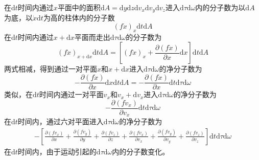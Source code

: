\documentclass[12pt,a4paper]{article}
\newcommand{\dif}{\mathrm{d}}
\begin{document}
在$\dif t$时间内通过$x$平面中的面积$\dif A = \dif y \dif z \dif v_x \dif v_y \dif v_z$进入$\dif \tau \dif \omega$内的分子数为以$\dif A$为底，以$\dot{x} \dif t$为高的柱体内的分子数
\begin{equation*}
(f \dot{x})_x \dif t \dif A
\end{equation*}
在$\dif t$时间内通过$x +\dif x$平面而走出$\dif \tau \dif \omega$的分子数为
\begin{equation*}
(f \dot{x})_{x+\dif x} \dif t \dif A = \left[(f \dot{x})_x +\frac{\partial (f \dot{x})}{\partial x} \dif x\right] \dif t \dif A
\end{equation*}
两式相减，得到通过一对平面$x$和$x +\dif x$进入$\dif \tau \dif \omega$的净分子数为
\begin{equation*}
-\frac{\partial (f \dot{x})}{\partial x} \dif x \dif t \dif A = -\frac{\partial (f \dot{x})}{\partial x} \dif t \dif \tau \dif \omega
\end{equation*}
类似，在$\dif t$时间内通过一对平面$v_x$和$v_x +\dif v_x$进入$\dif \tau \dif \omega$的净分子数为
\begin{equation*}
-\frac{\partial (f \dot{v}_x)}{\partial v_x} \dif t \dif \tau \dif \omega
\end{equation*}
在$\dif t$时间内，通过六对平面进入$\dif \tau \dif \omega$的净分子数为
\begin{eqnarray*}
-\left[\frac{\partial (f  v_x)}{\partial x} +\frac{\partial (f  v_y)}{\partial y} +\frac{\partial (f  v_z)}{\partial z} +\frac{\partial (f \dot{v}_x)}{\partial v_x} +\frac{\partial (f \dot{v}_y)}{\partial v_y} +\frac{\partial (f \dot{v}_z)}{\partial v_z}  \right] \dif t \dif \tau \dif \omega
\end{eqnarray*}
在$\dif t$时间内，由于运动引起的$\dif \tau \dif \omega$内的分子数变化。
\end{document}
